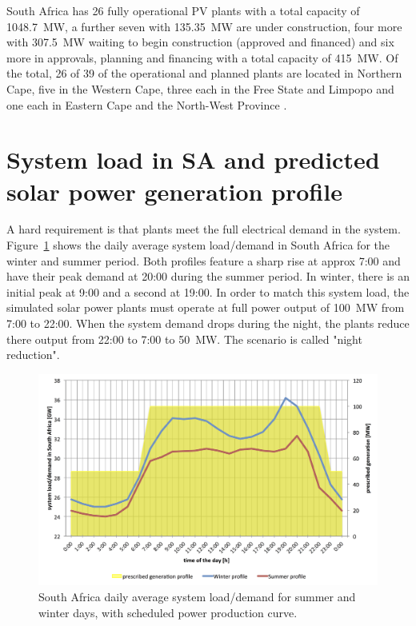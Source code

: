 South Africa has 26 fully operational PV plants with a total capacity of \SI{1048.7}{\mega\watt}, a further seven with \SI{135.35}{\mega\watt} are under construction, four more with \SI{307.5}{\mega\watt} waiting to begin construction (approved and financed) and six more in approvals, planning and financing with a total capacity of \SI{415}{\mega\watt}. Of the total, 26 of 39 of the operational and planned plants are located in Northern Cape, five in the Western Cape, three each in the Free State and Limpopo and one each in Eastern Cape and the North-West Province \cite{Forder2015}.

\pagebreak
\section{System load in SA and predicted solar power generation profile} \label{SystemloadinSA}
A hard requirement is that plants meet the full electrical demand in the system. Figure~\ref{LoadScenarios} shows the daily average system load/demand in South Africa for the winter and summer period.
Both profiles feature a sharp rise at approx 7:00 and have their peak demand at 20:00 during the summer period.
In winter, there is an initial peak at 9:00 and a second at 19:00.
In order to match this system load, the simulated solar power plants must operate at full power output of \SI{100}{MW} from 7:00 to 22:00. When the system demand drops during the night, the plants reduce there output from 22:00 to 7:00 to \SI{50}{MW}. The scenario is called "night reduction".
\begin{figure}[htbp]  
\centering
\includegraphics[width=1\linewidth]{FIG/LoadScenarios}
\caption[South Africa daily average system load/demand for summer and winter days, with scheduled power production curve.]{South Africa daily average system load/demand for summer and winter days, with scheduled power production curve.}\label{LoadScenarios}
\end{figure}
